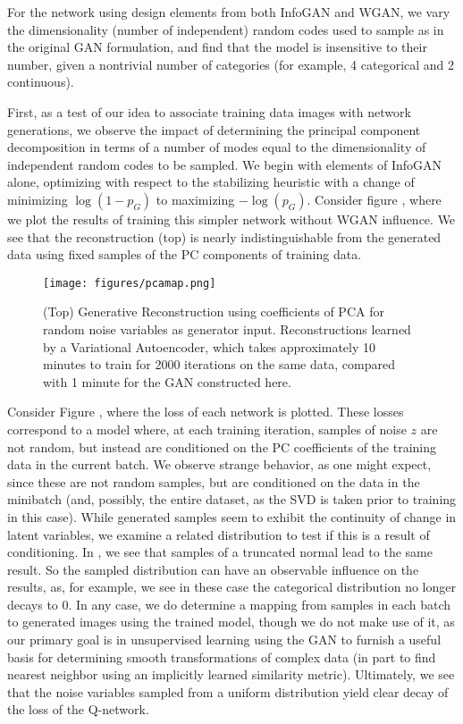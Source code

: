\documentclass{article}
\begin{document}
For the network using design elements from both InfoGAN and WGAN, we vary the dimensionality (number of independent) random codes used to sample as in the original GAN formulation, and find that the model is insensitive to their number, given a nontrivial number of categories (for example, 4 categorical and 2 continuous).

First, as a test of our idea to associate training data images with network generations, we observe the impact of determining the principal component decomposition in terms of a number of modes equal to the dimensionality of independent random codes to be sampled.  We begin with elements of InfoGAN alone, optimizing with respect to the stabilizing heuristic with a change of minimizing $\log(1-p_G)$ to maximizing $-\log(p_G)$. Consider figure \label{mapPCA}, where we plot the results of training this simpler network without WGAN influence.  We see that the reconstruction (top) is nearly indistinguishable from the generated data using fixed samples of the PC components of training data.

\begin{figure}[h]
  \texttt{[image: figures/pcamap.png]}
  \caption{ (Top) Generative Reconstruction using coefficients of PCA for random noise variables as generator input.  Reconstructions learned by a Variational Autoencoder, which takes approximately 10 minutes to train for 2000 iterations on the same data, compared with 1 minute for the GAN constructed here.}
\end{figure}\label{mapPCA}

Consider Figure \label{zPCA}, where the loss of each network is plotted.  These losses correspond to a model where, at each training iteration, samples of noise $z$ are not random, but instead are conditioned on the PC coefficients of the training data in the current batch. We observe strange behavior, as one might expect, since these are not random samples, but are conditioned on the data in the minibatch (and, possibly, the entire dataset, as the SVD is taken prior to training in this case).  While generated samples seem to exhibit the continuity of change in latent variables, we examine a related distribution to test if this is a result of conditioning.  In \label{tnorm}, we see that samples of a truncated normal lead to the same result.  So the sampled distribution can have an observable influence on the results, as, for example, we see in these case the categorical distribution no longer decays to $0$.  In any case, we do determine a mapping from samples in each batch to generated images using the trained model, though we do not make use of it, as our primary goal is in unsupervised learning using the GAN to furnish a useful basis for determining smooth transformations of complex data (in part to find nearest neighbor using an implicitly learned similarity metric).
Ultimately, we see that the noise variables sampled from a uniform distribution yield clear decay of the loss of the Q-network.
\end{document}
